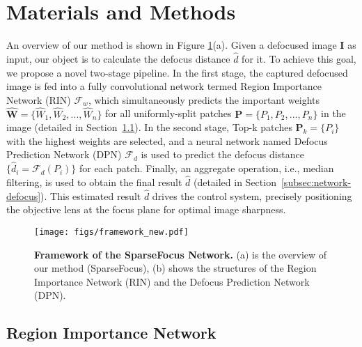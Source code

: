 \section{Materials and Methods}\label{sec:experiments}

An overview of our method is shown in Figure \ref{fig:framework}(a). Given a defocused image $\mathbf{I}$ as input, our object is to calculate the defocus distance $\widehat{d}$ for it.
To achieve this goal, we propose a novel two-stage pipeline. In the first stage, the captured defocused image is fed into a fully convolutional network termed Region Importance Network (RIN) $\mathcal{F}_w$, which simultaneously predicts the important weights $\widehat{\mathbf{W}} = \{ \widehat{W}_1, \widehat{W}_2, ..., \widehat{W}_n \}$ for all uniformly-split patches $\mathbf{P} = \{ P_1, P_2, ..., P_n \}$ in the image (detailed in Section~\ref{subsec:network-weight}). In the second stage, Top-k patches $\mathbf{P}_k = \{ P_i \}$ with the highest weights are selected, and a neural network named Defocus Prediction Network (DPN) $\mathcal{F}_d$ is used to predict the defocus distance $\{ \widehat{d}_i = \mathcal{F}_d(P_i) \}$ for each patch. Finally, an aggregate operation, i.e., median filtering, is used to obtain the final result $\widehat{d}$ (detailed in Section~\ref{subsec:network-defocus}). This estimated result $\widehat{d}$ drives the control system, precisely positioning the objective lens at the focus plane for optimal image sharpness.

\begin{figure}[htbp]
	\centering
	\texttt{[image: figs/framework\_new.pdf]}
	\caption{\textbf{Framework of the SparseFocus Network.} (a) is the overview of our method (SparseFocus), (b) shows the structures of the Region Importance Network (RIN) and the Defocus Prediction Network (DPN).}
	\label{fig:framework}
\end{figure}

\subsection{Region Importance Network}\label{subsec:network-weight}


